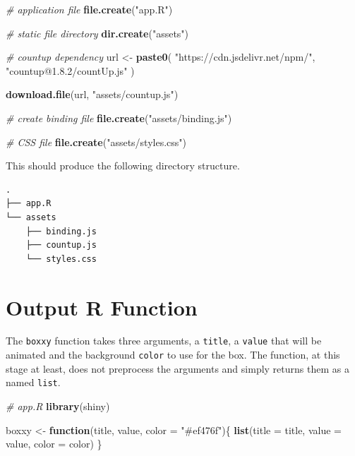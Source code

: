 \documentclass[
]{krantz}
\makeatletter
\newenvironment{Shaded}{\begin{snugshade}}{\end{snugshade}}
\newcommand{\CommentTok}[1]{\textcolor[rgb]{0.37,0.37,0.37}{\textit{#1}}}
\newcommand{\ControlFlowTok}[1]{\textcolor[rgb]{0.27,0.27,0.27}{\textbf{#1}}}
\newcommand{\DataTypeTok}[1]{\textcolor[rgb]{0.27,0.27,0.27}{#1}}
\newcommand{\KeywordTok}[1]{\textcolor[rgb]{0.27,0.27,0.27}{\textbf{#1}}}
\newcommand{\NormalTok}[1]{#1}
\newcommand{\StringTok}[1]{\textcolor[rgb]{0.5,0.5,0.5}{#1}}
\newenvironment{kframe}{%
\medskip{}
\setlength{\fboxsep}{.8em}
 \def\at@end@of@kframe{}%
 \ifinner\ifhmode%
  \def\at@end@of@kframe{\end{minipage}}%
  \begin{minipage}{\columnwidth}%
 \fi\fi%
 \def\FrameCommand##1{\hskip\@totalleftmargin \hskip-\fboxsep
 \colorbox{shadecolor}{##1}\hskip-\fboxsep
     \hskip-\linewidth \hskip-\@totalleftmargin \hskip\columnwidth}%
 \MakeFramed {\advance\hsize-\width
   \@totalleftmargin\z@ \linewidth\hsize
   \@setminipage}}%
 {\par\unskip\endMakeFramed%
 \at@end@of@kframe}
\renewenvironment{Shaded}{\begin{kframe}}{\end{kframe}}
\makeatother
\begin{document}
\begin{Shaded}
\begin{Highlighting}[]
\CommentTok{\# application file}
\KeywordTok{file.create}\NormalTok{(}\StringTok{"app.R"}\NormalTok{)}

\CommentTok{\# static file directory}
\KeywordTok{dir.create}\NormalTok{(}\StringTok{"assets"}\NormalTok{)}

\CommentTok{\# countup dependency}
\NormalTok{url \textless{}{-}}\StringTok{ }\KeywordTok{paste0}\NormalTok{(}
  \StringTok{"https://cdn.jsdelivr.net/npm/"}\NormalTok{,}
  \StringTok{"countup@1.8.2/countUp.js"}
\NormalTok{)}

\KeywordTok{download.file}\NormalTok{(url, }\StringTok{"assets/countup.js"}\NormalTok{)}

\CommentTok{\# create binding file}
\KeywordTok{file.create}\NormalTok{(}\StringTok{"assets/binding.js"}\NormalTok{)}

\CommentTok{\# CSS file}
\KeywordTok{file.create}\NormalTok{(}\StringTok{"assets/styles.css"}\NormalTok{)}
\end{Highlighting}
\end{Shaded}

This should produce the following directory structure.

\begin{verbatim}
.
├── app.R
└── assets
    ├── binding.js
    ├── countup.js
    └── styles.css
\end{verbatim}

\hypertarget{shiny-output-r-fun}{%
\section{Output R Function}\label{shiny-output-r-fun}}

The \texttt{boxxy} function takes three arguments, a \texttt{title}, a \texttt{value} that will be animated and the background \texttt{color} to use for the box. The function, at this stage at least, does not preprocess the arguments and simply returns them as a named \texttt{list}.

\begin{Shaded}
\begin{Highlighting}[]
\CommentTok{\# app.R}
\KeywordTok{library}\NormalTok{(shiny)}

\NormalTok{boxxy \textless{}{-}}\StringTok{ }\ControlFlowTok{function}\NormalTok{(title, value, }\DataTypeTok{color =} \StringTok{"\#ef476f"}\NormalTok{)\{}
  \KeywordTok{list}\NormalTok{(}\DataTypeTok{title =}\NormalTok{ title, }\DataTypeTok{value =}\NormalTok{ value, }\DataTypeTok{color =}\NormalTok{ color)}
\NormalTok{\}}
\end{Highlighting}
\end{Shaded}
\end{document}
